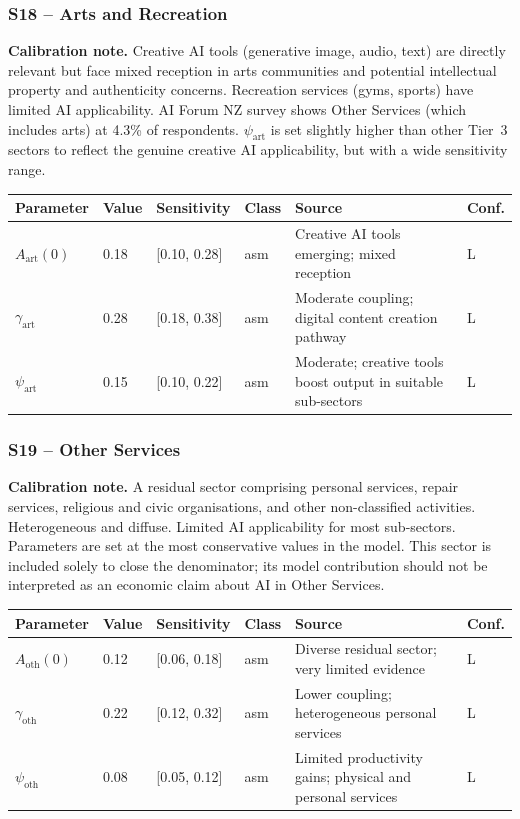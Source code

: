 \documentclass[11pt,a4paper]{article}
\begin{document}
\subsubsection*{S18 -- Arts and Recreation}

\textbf{Calibration note.} Creative AI tools (generative image, audio, text) are directly relevant but face mixed reception in arts communities and potential intellectual property and authenticity concerns. Recreation services (gyms, sports) have limited AI applicability. AI Forum NZ survey shows Other Services (which includes arts) at 4.3\% of respondents. $\psi_{\text{art}}$ is set slightly higher than other Tier~3 sectors to reflect the genuine creative AI applicability, but with a wide sensitivity range.

\begin{center}
\begin{tabular}{llllll}
\toprule
Parameter & Value & Sensitivity & Class & Source & Conf.\\
\midrule
$A_{\text{art}}(0)$ & 0.18 & [0.10, 0.28] & asm & Creative AI tools emerging; mixed reception & L \\
$\gamma_{\text{art}}$ & 0.28 & [0.18, 0.38] & asm & Moderate coupling; digital content creation pathway & L \\
$\psi_{\text{art}}$ & 0.15 & [0.10, 0.22] & asm & Moderate; creative tools boost output in suitable sub-sectors & L \\
\bottomrule
\end{tabular}
\end{center}

\subsubsection*{S19 -- Other Services}

\textbf{Calibration note.} A residual sector comprising personal services, repair services, religious and civic organisations, and other non-classified activities. Heterogeneous and diffuse. Limited AI applicability for most sub-sectors. Parameters are set at the most conservative values in the model. This sector is included solely to close the denominator; its model contribution should not be interpreted as an economic claim about AI in Other Services.

\begin{center}
\begin{tabular}{llllll}
\toprule
Parameter & Value & Sensitivity & Class & Source & Conf.\\
\midrule
$A_{\text{oth}}(0)$ & 0.12 & [0.06, 0.18] & asm & Diverse residual sector; very limited evidence & L \\
$\gamma_{\text{oth}}$ & 0.22 & [0.12, 0.32] & asm & Lower coupling; heterogeneous personal services & L \\
$\psi_{\text{oth}}$ & 0.08 & [0.05, 0.12] & asm & Limited productivity gains; physical and personal services & L \\
\bottomrule
\end{tabular}
\end{center}
\end{document}
